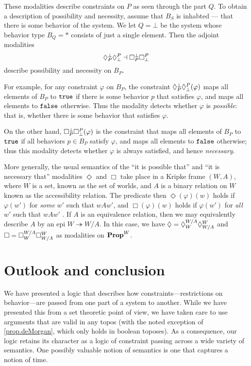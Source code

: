 These modalities describe constraints on $P$ as seen through the part $Q$. To
obtain a description of possibility and necessity, assume that $B_S$ is inhabted
--- that there is some behavior of the system. We let $Q=\bot$ be the system whose behavior type $B_Q=\ast$ consists of just a single element. Then the adjoint modalities
$$\allows{\bot}{P}\allows{P}{\bot} \dashv \ensure{\bot}{P}\ensure{P}{\bot}$$
describe possibility and necessity on $B_P$. 

For example, for any constraint $\varphi$ on $B_P$, the constraint $\allows{\bot}{P}\allows{P}{\bot}(\varphi)$ maps all elements of $B_P$ to $\true$ if there is some behavior $p$ that satisfies $\varphi$, and maps all elements to $\false$ otherwise. Thus the modality detects whether $\varphi$ is \emph{possible}: that is, whether there is some behavior that satisfies $\varphi$. 

On the other hand, $\ensure{\bot}{P}\ensure{P}{\bot}(\varphi)$ is the constraint that maps all elements of $B_P$ to $\true$ if all behaviors $p \in B_P$ satisfy $\varphi$, and maps all elements to $\false$ otherwise; thus this modality detects whether $\varphi$ is always satisfied, and hence \emph{necessary}.

More generally, the usual semantics of the ``it is possible that'' and ``it is necessary that'' modalities $\Diamond$ and $\Box$ take place in a Kripke frame $(W,A)$, where $W$ is a set, known as the set of worlds, and $A$ is a binary relation on $W$ known as the accessibility relation. The predicate then $\Diamond(\varphi)(w)$ holds if $\varphi(w')$ for \emph{some} $w'$ such that $wAw'$, and $\Box(\varphi)(w)$ holds if $\varphi(w')$ for \emph{all} $w'$ such that $wAw'$ \cite{kripke1963semantical}. If $A$ is an equivalence relation, then we may equivalently describe $A$ by an epi $W \twoheadrightarrow W/A$. In this case, we have $\Diamond=\allows{W/A}{W}\allows{W}{W/A}$ and $\Box= \ensure{W/A}{W}\ensure{W}{W/A}$ as modalities on $\Prop^W$. 

\section{Outlook and conclusion}
We have presented a logic that describes how constraints---restrictions on behavior---are passed from one part of a system to another. While we have presented this from a set theoretic point of view, we have taken care to use arguments that are valid in any topos (with the noted exception of \cref{prop.deMorgan}, which only holds in boolean toposes). As a consequence, our logic retains its character as a logic of constraint passing across a wide variety of semantics. One possibly valuable notion of semantics is one that captures a notion of time.

